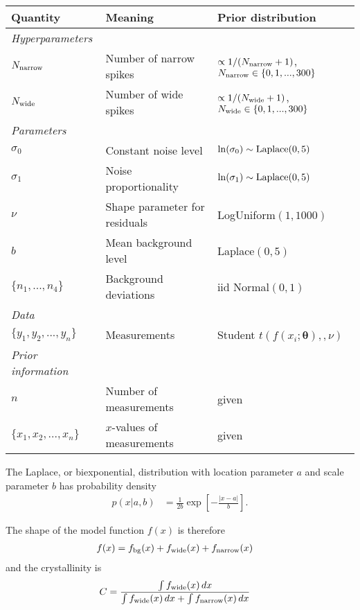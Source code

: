 \documentclass[a4paper, 12pt]{article}
\newcommand{\params}{\boldsymbol{\theta}}
\begin{document}
\begin{table}
\centering
\begin{tabular}{|lll|}
\hline
{\bf Quantity}      &   {\bf Meaning}   &  {\bf Prior distribution}\\
\hline
{\em Hyperparameters} & &\\
$N_{\rm narrow}$   &   Number of narrow spikes    &  $\propto 1/(N_{\rm narrow}+1)$, $N_{\rm narrow} \in \{0, 1, ..., 300\}$ \\
$N_{\rm wide}$   &   Number of wide spikes    &  $\propto 1/(N_{\rm wide}+1)$,
$N_{\rm wide} \in \{0, 1, ..., 300\}$ \\

\hline
{\em Parameters}& &\\
$\sigma_0$ &    Constant noise level  &   $\ln(\sigma_0) \sim \textnormal{Laplace}(0,5)$\\
$\sigma_1$ &    Noise proportionality   &  $\ln(\sigma_1) \sim \textnormal{Laplace}(0,5)$ \\
$\nu$     &   Shape parameter for residuals   &   LogUniform$(1, 1000)$\\
$b$       & Mean background level       & Laplace$(0, 5)$\\
$\{n_1, ..., n_4\}$  & Background deviations & iid Normal$(0,1)$\\
\hline
{\em Data}&&\\
\hline
$\{y_1, y_2, ..., y_n\}$  &   Measurements    & Student $t(f(x_i; \params), ,\nu)$\\
\hline
{\em Prior information}&&\\
\hline
$n$ & Number of measurements & given\\
$\{x_1, x_2, ..., x_n\}$  & $x$-values of measurements & given \\
\hline
\end{tabular}
\caption{\label{tab:priors}}
\end{table}

The Laplace, or biexponential, distribution with location parameter $a$ and
scale parameter $b$ has probability density
\begin{align}
p(x | a, b) &= \frac{1}{2b}\exp\left[-\frac{|x - a|}{b}\right].
\end{align}


The shape of the model function $f(x)$ is therefore
\begin{align}
f(x) &= f_{\rm bg}(x) + f_{\rm wide}(x) + f_{\rm narrow}(x)
\end{align}
and the crystallinity is
\begin{align}
C &= \frac{\int f_{\rm wide}(x) \, dx}
          {\int f_{\rm wide}(x) \, dx + \int f_{\rm narrow}(x) \, dx}
\end{align}




\end{document}
